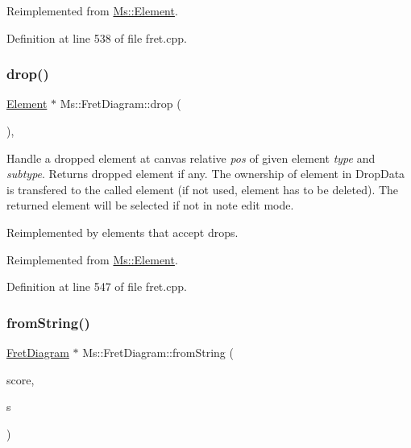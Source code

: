 Reimplemented from \hyperlink{class_ms_1_1_element_a35614445f0bc2212cbcc75c3f5810543}{Ms\+::\+Element}.



Definition at line 538 of file fret.\+cpp.

\mbox{\label{class_ms_1_1_fret_diagram_ae054df6c63b099396073d3f4c6604262}} 
\subsubsection{\texorpdfstring{drop()}{drop()}}
{\footnotesize\ttfamily \hyperlink{class_ms_1_1_element}{Element} $\ast$ Ms\+::\+Fret\+Diagram\+::drop (\begin{DoxyParamCaption}\item[{\hyperlink{class_ms_1_1_edit_data}{Edit\+Data} \&}]{ }\end{DoxyParamCaption})\hspace{0.3cm}{\ttfamily [override]}, {\ttfamily [virtual]}}

Handle a dropped element at canvas relative {\itshape pos} of given element {\itshape type} and {\itshape subtype}. Returns dropped element if any. The ownership of element in Drop\+Data is transfered to the called element (if not used, element has to be deleted). The returned element will be selected if not in note edit mode.

Reimplemented by elements that accept drops. 

Reimplemented from \hyperlink{class_ms_1_1_element_a0ca69a9fb48e7b9fb481aacaf3860032}{Ms\+::\+Element}.



Definition at line 547 of file fret.\+cpp.

\mbox{\label{class_ms_1_1_fret_diagram_a06ddcd684ffef74c489176980ba9b871}} 
\subsubsection{\texorpdfstring{from\+String()}{fromString()}}
{\footnotesize\ttfamily \hyperlink{class_ms_1_1_fret_diagram}{Fret\+Diagram} $\ast$ Ms\+::\+Fret\+Diagram\+::from\+String (\begin{DoxyParamCaption}\item[{\hyperlink{class_ms_1_1_score}{Score} $\ast$}]{score,  }\item[{const Q\+String \&}]{s }\end{DoxyParamCaption})\hspace{0.3cm}{\ttfamily [static]}}

